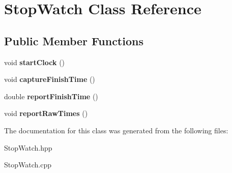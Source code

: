 \hypertarget{classStopWatch}{}\section{Stop\+Watch Class Reference}
\label{classStopWatch}
\subsection*{Public Member Functions}
\begin{DoxyCompactItemize}
\item 
\mbox{\label{classStopWatch_a4d11f9e0d4c77c8df78313e9e0643fca}} 
void {\bfseries start\+Clock} ()
\item 
\mbox{\label{classStopWatch_a2bf9c1940bc13449bace7be4626d78ec}} 
void {\bfseries capture\+Finish\+Time} ()
\item 
\mbox{\label{classStopWatch_afe6f7fc75f5ce4f2901383e1f6e020e8}} 
double {\bfseries report\+Finish\+Time} ()
\item 
\mbox{\label{classStopWatch_ae49d0704410ca4e30be49ba9e471bc3f}} 
void {\bfseries report\+Raw\+Times} ()
\end{DoxyCompactItemize}


The documentation for this class was generated from the following files\+:\begin{DoxyCompactItemize}
\item 
Stop\+Watch.\+hpp\item 
Stop\+Watch.\+cpp\end{DoxyCompactItemize}
